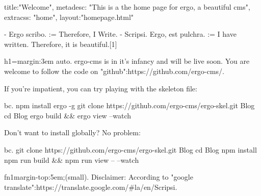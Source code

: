 {
title:"Welcome",
metadesc: "This is a the home page for ergo, a beautiful cms",
extracss: "home",
layout:"homepage.html"
}


- Ergo scribo. := Therefore, I Write.
- Scripsi. Ergo, est pulchra. :=  I have written. Therefore, it is beautiful.[1]


h1={margin:3em auto}. ergo-cms is in it's infancy and will be live soon. You are welcome to follow the code on "github":https://github.com/ergo-cms/.

If you're impatient, you can try playing with the skeleton file:

bc. npm install ergo -g
git clone https://github.com/ergo-cms/ergo-skel.git Blog
cd Blog
ergo build && ergo view --watch

Don't want to install globally? No problem:

bc. git clone https://github.com/ergo-cms/ergo-skel.git Blog
cd Blog
npm install
npm run build && npm run view -- --watch


fn1{margin-top:5em;}(small). Disclaimer: According to "google translate":https://translate.google.com/#la/en/Scripsi.%
